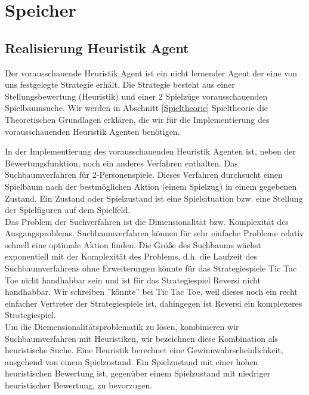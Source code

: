 \chapter{Speicher}





\section{Realisierung Heuristik Agent}
Der vorausschauende Heuristik Agent ist ein nicht lernender Agent der eine von uns festgelegte Strategie erhält. Die Strategie besteht aus einer Stellungsbewertung (Heuristik) und einer 2 Spielzüge vorausschauenden Spielbaumsuche. Wir werden in Abschnitt \ref{Spieltheorie} Spieltheorie die Theoretischen Grundlagen erklären, die wir für die Implementierung des vorausschauenden Heuristik Agenten benötigen.  


In der Implementierung des vorausschauenden Heuristik Agenten ist, neben der Bewertungsfunktion, noch ein anderes Verfahren enthalten. Das Suchbaumverfahren für 2-Personenspiele. Dieses Verfahren durchsucht einen Spielbaum nach der bestmöglichen Aktion (einem Spielzug) in einem gegebenen Zustand. Ein Zustand oder Spielzustand ist eine Spielsituation bzw. eine Stellung der Spielfiguren auf dem Spielfeld. \\

Das Problem der Suchverfahren ist die Dimensionalität bzw. Komplexität des Ausgangsproblems. Suchbaumverfahren können für sehr einfache Probleme relativ schnell eine optimale Aktion finden. Die Größe des Suchbaums wächst exponentiell mit der Komplexität des Problems, d.h. die Laufzeit des Suchbaumverfahrens ohne Erweiterungen könnte für das Strategiespiele Tic Tac Toe nicht handhabbar sein und ist für das Strategiespiel Reversi nicht handhabbar. Wir schreiben ''könnte'' bei Tic Tac Toe, weil dieses noch ein recht einfacher Vertreter der Strategiespiele ist, dahingegen ist Reversi ein komplexeres Strategiespiel. \\

Um die Diemensionalitätsproblematik zu lösen, kombinieren wir Suchbaumverfahren mit Heuristiken, wir bezeichnen diese Kombination als heuristische Suche. Eine Heuristik berechnet eine Gewinnwahrscheinlichkeit, ausgehend von einem Spielzustand. Ein Spielzustand mit einer hohen heuristischen Bewertung ist, gegenüber einem Spielzustand mit niedriger heuristischer Bewertung, zu bevorzugen. \\

